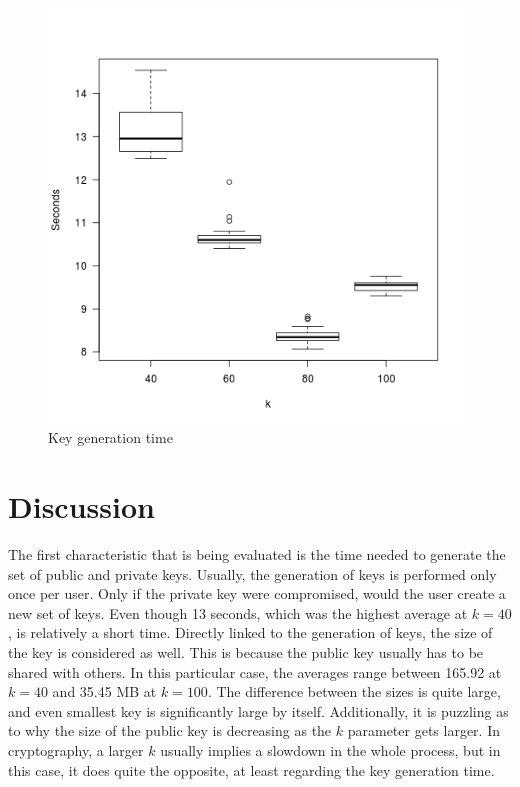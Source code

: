 \begin{figure}[H]
  \centerline{\includegraphics[height=11cm]{img/keygenplot}}
  \caption{Key generation time}
\end{figure}


\section{Discussion}

The first characteristic that is being evaluated is the time needed to generate the set of public and private keys. Usually, the generation of keys is performed only once per user. Only if the private key were compromised, would the user create a new set of keys. Even though 13 seconds, which was the highest average at $k=40$, is relatively a short time. Directly linked to the generation of keys, the size of the key is considered as well. This is because the public key usually has to be shared with others. In this particular case, the averages range between 165.92 at $k=40$  and 35.45 MB at $k=100$. The difference between the sizes is quite large, and even smallest key is significantly large by itself. Additionally, it is puzzling as to why the size of the public key is decreasing as the $k$ parameter gets larger. In cryptography, a larger $k$ usually implies a slowdown in the whole process, but in this case, it does quite the opposite, at least regarding the key generation time.



